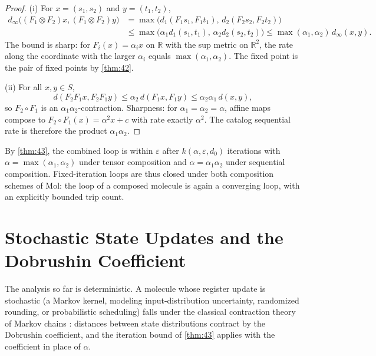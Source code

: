 \begin{proof}
(i) For $x = (s_1,s_2)$ and $y = (t_1,t_2)$,
\begin{align*}
d_\infty\bigl ((F_1\otimes F_2) x,(F_1\otimes F_2) y\bigr)
 &= \max\bigl (d_1 (F_1s_1,F_1t_1),\,d_2 (F_2s_2,F_2t_2)\bigr)\\
 &\leq \max\bigl (\alpha_1 d_1 (s_1,t_1),\,\alpha_2 d_2 (s_2,t_2)\bigr)
  \leq \max (\alpha_1,\alpha_2)\,d_\infty (x,y).
\end{align*}
The bound is sharp: for $F_i (x) = \alpha_i x$ on $\mathbb{R}$ with the sup metric on $\mathbb{R}^2$, the rate along the coordinate with the larger $\alpha_i$ equals $\max (\alpha_1,\alpha_2)$. The fixed point is the pair of fixed points by \autoref{thm:42}.

(ii) For all $x,y \in S$,
\[ d (F_2F_1x,F_2F_1y) \leq \alpha_2\,d (F_1x,F_1y) \leq \alpha_2\alpha_1\,d (x,y), \]
so $F_2 \circ F_1$ is an $\alpha_1\alpha_2$-contraction. Sharpness: for $\alpha_1 = \alpha_2 = \alpha$, affine maps compose to $F_2 \circ F_1 (x) = \alpha^2 x + c$ with rate exactly $\alpha^2$. The catalog sequential rate is therefore the product $\alpha_1\alpha_2$.
\end{proof}

\begin{remark}
By \autoref{thm:43}, the combined loop is within $\varepsilon$ after $k (\alpha,\varepsilon,d_0)$ iterations with $\alpha = \max (\alpha_1,\alpha_2)$ under tensor composition and $\alpha = \alpha_1\alpha_2$ under sequential composition. Fixed-iteration loops are thus closed under both composition schemes of Mol: the loop of a composed molecule is again a converging loop, with an explicitly bounded trip count.
\end{remark}

\section{Stochastic State Updates and the Dobrushin Coefficient}\label{sec:trace-markov}

The analysis so far is deterministic. A molecule whose register update is stochastic (a Markov kernel, modeling input-distribution uncertainty, randomized rounding, or probabilistic scheduling) falls under the classical contraction theory of Markov chains \citep{dobroushin}: distances between state distributions contract by the Dobrushin coefficient, and the iteration bound of \autoref{thm:43} applies with the coefficient in place of $\alpha$.

